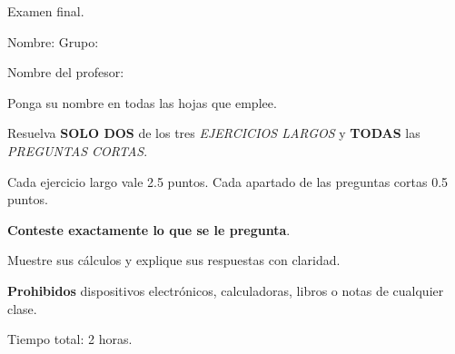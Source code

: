 \begin{center}
  {Examen final}. \fechaExamen
\end{center}
\smallskip

{Nombre}: \underline{\qquad\hspace{10cm} \qquad} {Grupo}: \hrulefill
\vspace{.5cm}

{Nombre del profesor}: \hrulefill

\begin{compactitem}
\item {Ponga su nombre en todas las hojas que emplee}.
\item {Resuelva \textbf{SOLO DOS} de los tres \textsl{EJERCICIOS LARGOS} y \textbf{TODAS} las \textsl{PREGUNTAS CORTAS}}.
\item {Cada ejercicio largo vale 2.5 puntos. Cada apartado de las preguntas cortas 0.5 puntos}.
\item {\textbf{Conteste exactamente lo que se le pregunta}}.
\item {Muestre sus cálculos y explique sus respuestas con claridad}.
\item {\textbf{Prohibidos} dispositivos electrónicos, calculadoras, libros o notas de cualquier clase}.
\item {Tiempo total: 2 horas}.
\end{compactitem}
\hrulefill

\endinput
